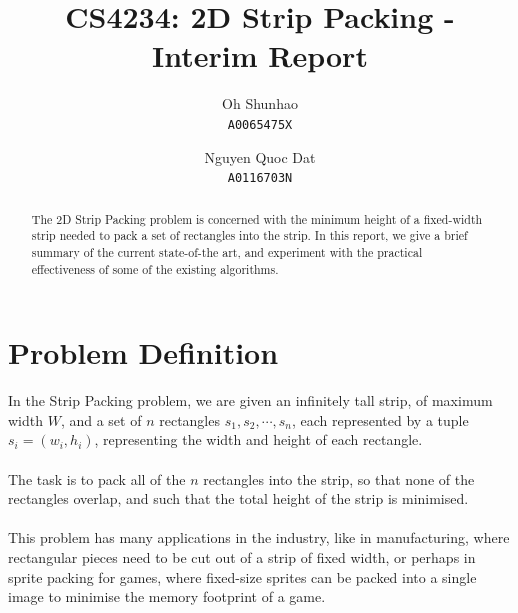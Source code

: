 \documentclass{article}
\begin{document}
\theoremstyle{plain}
\newtheorem{thm}{Theorem}
\newtheorem{lem}[thm]{Lemma}
\newtheorem{prop}[thm]{Proposition}
\newtheorem{corr}{Corollary}
\theoremstyle{definition}
\newtheorem{defn}{Definition}
\newtheorem{conj}{Conjecture}
\newtheorem{exmp}{Example}
\theoremstyle{remark}
\newtheorem*{rem}{Remark}
\newtheorem*{note}{Note}
\newtheorem{case}{Case}

\author{
Oh Shunhao\\
  \texttt{A0065475X}
  \and
Nguyen Quoc Dat\\
  \texttt{A0116703N}
}
\title{CS4234: 2D Strip Packing - Interim Report}
\date{}

\maketitle

\begin{abstract}
\begin{center}
The 2D Strip Packing problem is concerned with the minimum height of a fixed-width strip needed to pack a set of rectangles into the strip. In this report, we give a brief summary of the current state-of-the art, and experiment with the practical effectiveness of some of the existing algorithms.
\end{center}
\end{abstract}

\section{Problem Definition}
In the Strip Packing problem, we are given an infinitely tall strip, of maximum width $W$, and a set of $n$ rectangles $s_1,s_2,\cdots,s_n$, each represented by a tuple $s_i = (w_i,h_i)$, representing the width and height of each rectangle.\\
\\
The task is to pack all of the $n$ rectangles into the strip, so that none of the rectangles overlap, and such that the total height of the strip is minimised.\\
\\
This problem has many applications in the industry, like in manufacturing, where rectangular pieces need to be cut out of a strip of fixed width, or perhaps in sprite packing for games, where fixed-size sprites can be packed into a single image to minimise the memory footprint of a game.\\
\end{document}
